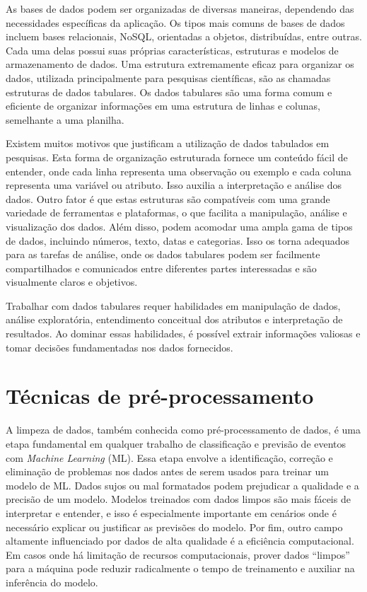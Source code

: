 \documentclass[tcc2]{uftex}
\begin{document}
As bases de dados podem ser organizadas de diversas maneiras, dependendo das necessidades específicas da aplicação. Os tipos mais comuns de bases de dados incluem bases relacionais, NoSQL, orientadas a objetos, distribuídas, entre outras. Cada uma delas possui suas próprias características, estruturas e modelos de armazenamento de dados. Uma estrutura extremamente eficaz para organizar os dados, utilizada principalmente para pesquisas científicas, são as chamadas estruturas de dados tabulares. Os dados tabulares são uma forma comum e eficiente de organizar informações em uma estrutura de linhas e colunas, semelhante a uma planilha.

Existem muitos motivos que justificam a utilização de dados tabulados em pesquisas. Esta forma de organização estruturada fornece um conteúdo fácil de entender, onde cada linha representa uma observação ou exemplo e cada coluna representa uma variável ou atributo. Isso auxilia a interpretação e análise dos dados. Outro fator é que estas estruturas são compatíveis com uma grande variedade de ferramentas e plataformas, o que facilita a manipulação, análise e visualização dos dados. Além disso, podem acomodar uma ampla gama de tipos de dados, incluindo números, texto, datas e categorias. Isso os torna adequados para as tarefas de análise, onde os dados tabulares podem ser facilmente compartilhados e comunicados entre diferentes partes interessadas e são visualmente claros e objetivos.

Trabalhar com dados tabulares requer habilidades em manipulação de dados, análise exploratória, entendimento conceitual dos atributos e interpretação de resultados. Ao dominar essas habilidades, é possível extrair informações valiosas e tomar decisões fundamentadas nos dados fornecidos.

\section{Técnicas de pré-processamento}

A limpeza de dados, também conhecida como pré-processamento de dados, é uma etapa fundamental em qualquer trabalho de classificação e previsão de eventos com \textit{Machine Learning} (ML). Essa etapa envolve a identificação, correção e eliminação de problemas nos dados antes de serem usados para treinar um modelo de ML. Dados sujos ou mal formatados podem prejudicar a qualidade e a precisão de um modelo. Modelos treinados com dados limpos são mais fáceis de interpretar e entender, e isso é especialmente importante em cenários onde é necessário explicar ou justificar as previsões do modelo. Por fim, outro campo altamente influenciado por dados de alta qualidade é a eficiência computacional. Em casos onde há limitação de recursos computacionais, prover dados ``limpos'' para a máquina pode reduzir radicalmente o tempo de treinamento e auxiliar na inferência do modelo.
\end{document}

